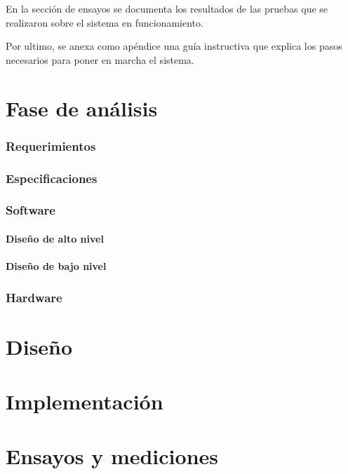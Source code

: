 En la sección de ensayos se documenta los resultados de las pruebas que se realizaron sobre el sistema en funcionamiento.

Por ultimo, se anexa como apéndice una guía instructiva que explica los pasos necesarios para poner en marcha el sistema.

\part{Fase de análisis}\label{part:analisis}
\section{Requerimientos}
\section{Especificaciones}
\section{Software}
\subsection{Diseño de alto nivel}
\subsection{Diseño de bajo nivel}
\section{Hardware}
\part{Diseño}\label{part:diseno}
\part{Implementación}\label{part:impl}
\part{Ensayos y mediciones}\label{part:ensayos}